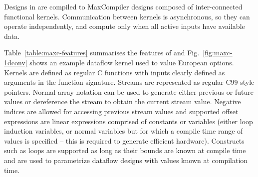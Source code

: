 Designs in \MAXC{} are compiled to MaxCompiler designs composed of
inter-connected functional kernels. Communication between kernels is
asynchronous, so they can operate independently, and compute only when
all active inputs have available data.

Table~\ref{table:maxc-features} summarises the features of \MAXC{} and
Fig.~\ref{fig:maxc-1dconv} shows an example dataflow kernel used to
value European options. Kernels are defined as regular C functions
with inputs clearly defined as arguments in the function
signature. Streams are represented as regular C99-style pointers.
Normal array notation can be used to generate either previous or
future values or dereference the stream to obtain the current stream
value. Negative indices are allowed for accessing previous stream
values and supported offset expressions are linear expressions
comprised of constants or variables (either loop induction variables,
or normal variables but for which a compile time range of values is
specified -- this is required to generate efficient
hardware). Constructs such as loops are supported as long as their
bounds are known at compile time and are used to parametrize dataflow
designs with values known at compilation time.

